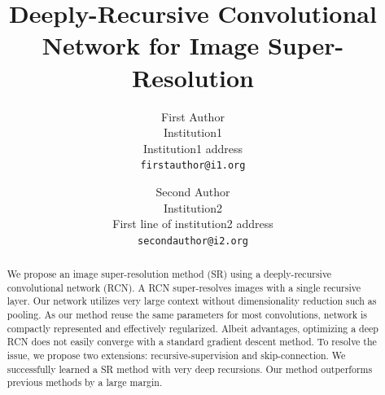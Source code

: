 \documentclass[10pt,twocolumn,letterpaper]{article}
\begin{document}


\title{Deeply-Recursive Convolutional Network for Image Super-Resolution}

\author{First Author\\
	Institution1\\
	Institution1 address\\
	{\tt\small firstauthor@i1.org}
	\and
	Second Author\\
	Institution2\\
	First line of institution2 address\\
	{\tt\small secondauthor@i2.org}
}

\maketitle



\begin{abstract}
We propose an image super-resolution method (SR) using a deeply-recursive convolutional network (RCN). A RCN super-resolves images with a single recursive layer. Our network utilizes very large context without dimensionality reduction such as pooling. As our method reuse the same parameters for most convolutions, network is compactly represented and effectively regularized. Albeit advantages, optimizing a deep RCN does not easily converge with a standard gradient descent method. To resolve the issue, we propose two extensions: recursive-supervision and skip-connection. We successfully learned a SR method with very deep recursions. Our method outperforms previous methods by a large margin.
\end{abstract}
\end{document}
